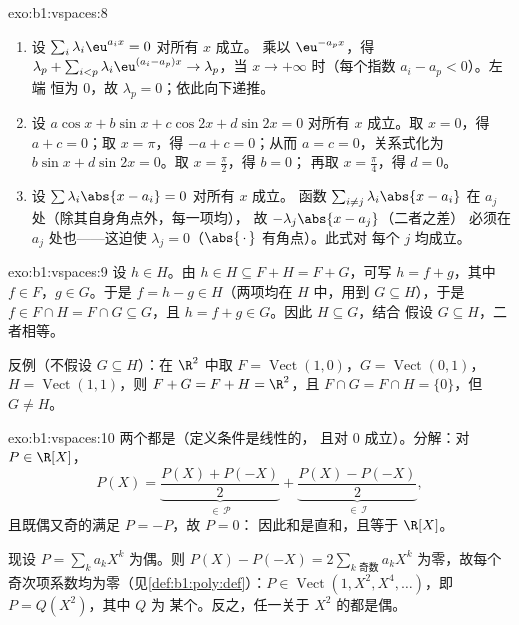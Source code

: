 \begin{solution}{exo:b1:vspaces:8}
\begin{enumerate}
  \item 设 $\sum_{i} \lambda_i \eu^{a_i x} = 0$ 对所有 $x$ 成立。
        乘以 $\eu^{-a_p x}$，得 $\lambda_p + \sum_{i < p}
        \lambda_i \eu^{(a_i - a_p)x} \to \lambda_p$，当 $x \to
        +\infty$ 时（每个指数 $a_i - a_p < 0$）。左端
        恒为 $0$，故 $\lambda_p = 0$；依此向下递推。
  \item 设 $a\cos x + b \sin x + c \cos 2x + d\sin 2x = 0$ 对所有
        $x$ 成立。取 $x = 0$，得 $a + c = 0$；取 $x = \pi$，得 $-a + c
        = 0$；从而 $a = c = 0$，关系式化为 $b\sin
        x + d \sin 2x = 0$。取 $x = \frac\pi2$，得 $b = 0$；
        再取 $x = \frac\pi4$，得 $d = 0$。
  \item 设 $\sum \lambda_i \abs{x - a_i} = 0$ 对所有 $x$ 成立。
        函数 $\sum_{i \neq j} \lambda_i\abs{x - a_i}$ 在
        $a_j$ 处（除其自身角点外，每一项均），
        故 $-\lambda_j \abs{x - a_j}$（二者之差）
        必须在 $a_j$ 处也——这迫使
        $\lambda_j = 0$（$\abs{\,\cdot\,}$ 有角点）。此式对
        每个 $j$ 均成立。
\end{enumerate}
\end{solution}

\begin{solution}{exo:b1:vspaces:9}
设 $h \in H$。由 $h \in H \subseteq F + H = F + G$，可写 $h = f
+ g$，其中 $f \in F$，$g \in G$。于是 $f = h - g \in H$（两项均在
$H$ 中，用到 $G \subseteq H$），于是 $f \in F \cap H = F \cap G
\subseteq G$，且 $h = f + g \in G$。因此 $H \subseteq G$，结合
假设 $G \subseteq H$，二者相等。

反例（不假设 $G \subseteq H$）：在 $\R^2$ 中取 $F =
\operatorname{Vect}(1,0)$，$G = \operatorname{Vect}(0,1)$，$H =
\operatorname{Vect}(1,1)$，则 $F + G = F + H = \R^2$，且 $F \cap G
= F \cap H = \{0\}$，但 $G \neq H$。
\end{solution}

\begin{solution}{exo:b1:vspaces:10}
两个都是（定义条件是线性的，
且对 $0$ 成立）。分解：对 $P \in \R[X]$，
\[
P(X) = \underbrace{\frac{P(X) + P(-X)}{2}}_{\in\,\mathcal P}
+ \underbrace{\frac{P(X) - P(-X)}{2}}_{\in\,\mathcal I},
\]
且既偶又奇的满足 $P = -P$，故 $P = 0$：
因此和是直和，且等于 $\R[X]$。

现设 $P = \sum_k a_k X^k$ 为偶。则 $P(X) - P(-X) = 2
\sum_{k \text{ 奇数}} a_k X^k$ 为零，故每个
奇次项系数均为零（见\cref{def:b1:poly:def}）：$P \in
\operatorname{Vect}(1, X^2, X^4, \dots)$，即 $P = Q(X^2)$，其中 $Q$ 为
某个。反之，任一关于 $X^2$ 的都是偶。
\end{solution}

